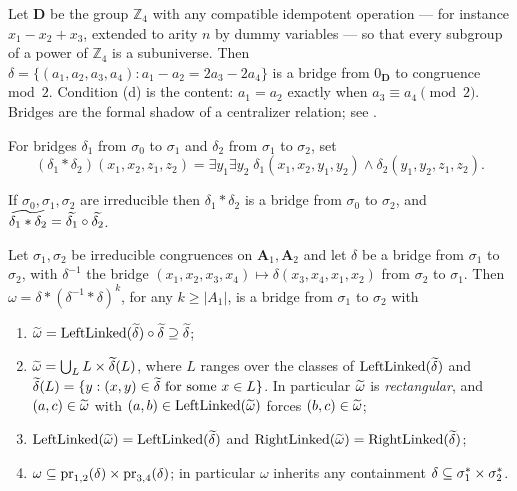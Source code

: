 \begin{remark}\label{rem:bridge-example}
Let $\mathbf D$ be the group $\mathbb Z_{4}$ with any compatible idempotent
operation --- for instance $x_{1}-x_{2}+x_{3}$, extended to arity $n$ by dummy
variables --- so that every subgroup of a power of $\mathbb Z_{4}$ is a
subuniverse. Then
$\delta=\{(a_{1},a_{2},a_{3},a_{4}):a_{1}-a_{2}=2a_{3}-2a_{4}\}$ is a bridge
from $0_{\mathbf D}$ to congruence mod~$2$. Condition (d) is the content:
$a_{1}=a_{2}$ exactly when $a_{3}\equiv a_{4}\pmod 2$. Bridges are the formal
shadow of a centralizer relation; see \cite{RossSlides}.
\end{remark}

\begin{definition}\label{def:bridge-comp}
For bridges $\delta_{1}$ from $\sigma_{0}$ to $\sigma_{1}$ and $\delta_{2}$
from $\sigma_{1}$ to $\sigma_{2}$, set
\[
  (\delta_{1}\ast\delta_{2})(x_{1},x_{2},z_{1},z_{2})
  =\exists y_{1}\exists y_{2}\;
   \delta_{1}(x_{1},x_{2},y_{1},y_{2})\wedge\delta_{2}(y_{1},y_{2},z_{1},z_{2}).
\]
\end{definition}

\begin{lemma}\label{lem:bridge-comp}
If $\sigma_{0},\sigma_{1},\sigma_{2}$ are irreducible then
$\delta_{1}\ast\delta_{2}$ is a bridge from $\sigma_{0}$ to $\sigma_{2}$, and
$\widetilde{\delta_{1}\ast\delta_{2}}=\widetilde{\delta_{1}}\circ\widetilde{\delta_{2}}$.
\end{lemma}

\begin{lemma}[Rectangularisation]\label{lem:rectangularise}
Let $\sigma_{1},\sigma_{2}$ be irreducible congruences on
$\mathbf A_{1},\mathbf A_{2}$ and let $\delta$ be a bridge from $\sigma_{1}$ to
$\sigma_{2}$, with $\delta^{-1}$ the bridge
$(x_{1},x_{2},x_{3},x_{4})\mapsto\delta(x_{3},x_{4},x_{1},x_{2})$ from
$\sigma_{2}$ to $\sigma_{1}$. Then
$\omega=\delta\ast(\delta^{-1}\ast\delta)^{k}$, for any $k\ge|A_{1}|$, is a
bridge from $\sigma_{1}$ to $\sigma_{2}$ with
\begin{enumerate}\alphlabels\tightlist
\item $\widetilde{\omega}=\operatorname{LeftLinked}(\widetilde{\delta})\circ\widetilde{\delta}
  \supseteq\widetilde{\delta}$;
\item $\widetilde{\omega}=\bigcup_{L}L\times\widetilde{\delta}(L)$, where $L$ ranges over the
  classes of $\operatorname{LeftLinked}(\widetilde{\delta})$ and
  $\widetilde{\delta}(L)=\{y:(x,y)\in\widetilde{\delta}\text{ for some }x\in L\}$. In
  particular $\widetilde{\omega}$ is \emph{rectangular}, and
  $(a,c)\in\widetilde{\omega}$ with $(a,b)\in\operatorname{LeftLinked}(\widetilde{\omega})$ forces
  $(b,c)\in\widetilde{\omega}$;
\item $\operatorname{LeftLinked}(\widetilde{\omega})=\operatorname{LeftLinked}(\widetilde{\delta})$ and
  $\operatorname{RightLinked}(\widetilde{\omega})=\operatorname{RightLinked}(\widetilde{\delta})$;
\item $\omega\subseteq\operatorname*{pr}_{1,2}(\delta)\times\operatorname*{pr}_{3,4}(\delta)$; in
  particular $\omega$ inherits any containment
  $\delta\subseteq\sigma_{1}^{*}\times\sigma_{2}^{*}$.
\end{enumerate}
\end{lemma}

